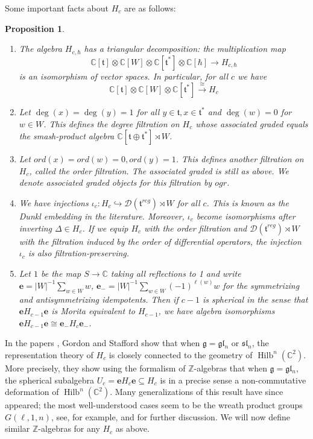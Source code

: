 \documentclass{amsart}
\numberwithin{equation}{section}
\newtheorem{proposition}[lemma]{Proposition}%
\theoremstyle{definition}
\DeclareMathOperator{\Hilb}{Hilb}
\newcommand{\fs}{\mathfrak{s}}
\newcommand{\fl}{\mathfrak{l}}
\newcommand{\fg}{\mathfrak{g}}
\newcommand{\ft}{\mathfrak{t}}
\newcommand{\C}{{\mathbb C}}
\newcommand{\Z}{{\mathbb Z}}
\newcommand{\Diff}{\mathcal{D}}
\newcommand{\e}{\mathbf{e}}
\begin{document}
Some important facts about $H_c$ are as follows:
\begin{proposition}
\label{prop:cherednikfacts}
\begin{enumerate}
    \item The algebra $H_{c,\hbar}$ has a triangular decomposition: the multiplication map $$\C[\ft]\otimes \C[W]\otimes \C[\ft^*]\otimes \C[\hbar] \to H_{c,\hbar}$$ is an isomorphism of vector spaces. In particular, for all $c$ we have $$\C[\ft]\otimes \C[W]\otimes \C[\ft^*]\xrightarrow{\cong} H_{c}$$
    \item Let $\deg(x)=\deg(y)=1$ for all $y\in\ft,x\in\ft^*$ and $\deg(w)=0$ for $w\in W$. This defines the {\em degree filtration} on $H_c$ whose associated graded equals the smash-product algebra $\C[\ft\oplus\ft^*]\rtimes W$. 
    \item Let $ord(x)=ord(w)=0,ord(y)=1$. This defines another filtration on $H_c$, called the {\em order filtration}. The associated graded is still as above. We denote associated graded objects for this filtration by $ogr$.
    \item We have injections $\iota_c: H_c\hookrightarrow \Diff(\ft^{reg})\rtimes W$ for all $c$. This is known as the Dunkl embedding in the literature. Moreover, $\iota_c$ become isomorphisms after inverting $\Delta\in H_c$. If we equip $H_c$ with the order filtration and $\Diff(\ft^{reg})\rtimes W$ with the filtration induced by the order of differential operators, the injection $\iota_c$ is also filtration-preserving.
    \item Let $1$ be the map $S\to \C$ taking all reflections to 1 and write $\e=|W|^{-1}\sum_{w\in W}w$, $\e_-=|W|^{-1}\sum_{w\in W}(-1)^{\ell(w)}w$ for the symmetrizing and antisymmetrizing idempotents. Then if $c-1$ is spherical in the sense that $\e H_{c-1}\e$ is Morita equivalent to $H_{c-1}$, we have algebra isomorphisms $\e H_{c-1}\e\cong \e_-H_c\e_-$.
\end{enumerate}
\end{proposition}

In the papers \cite{GS1,GS2}, Gordon and Stafford show that when $\fg=\fg\fl_n$ or $\fs\fl_n$, the representation theory of $H_c$ is closely connected to the geometry of $\Hilb^n(\C^2)$. More precisely, they show using the formalism of $\Z$-algebras that when $\fg=\fg\fl_n$, the spherical subalgebra $U_c=\e H_c \e\subseteq H_c$ is in a precise sense a non-commutative deformation of $\Hilb^n(\C^2)$. Many generalizations of this result have since appeared; the most well-understood cases seem to be the wreath product groups $G(\ell,1,n)$, see, for example, \cite{GordonO, Musson, Pre} and \cite{GordonICM} for further discussion. We will now define similar $\Z$-algebras for any $H_c$ as above.
\end{document}
